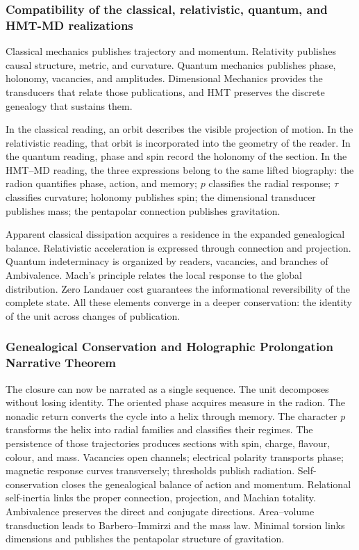 \subsubsection{Compatibility of the classical, relativistic, quantum, and HMT-MD realizations}

Classical mechanics publishes trajectory and momentum. Relativity publishes causal structure, metric, and curvature. Quantum mechanics publishes phase, holonomy, vacancies, and amplitudes. Dimensional Mechanics provides the transducers that relate those publications, and HMT preserves the discrete genealogy that sustains them.

In the classical reading, an orbit describes the visible projection of motion. In the relativistic reading, that orbit is incorporated into the geometry of the reader. In the quantum reading, phase and spin record the holonomy of the section. In the HMT--MD reading, the three expressions belong to the same lifted biography: the radion quantifies phase, action, and memory; \(p\) classifies the radial response; \(\tau\) classifies curvature; holonomy publishes spin; the dimensional transducer publishes mass; the pentapolar connection publishes gravitation.

Apparent classical dissipation acquires a residence in the expanded genealogical balance. Relativistic acceleration is expressed through connection and projection. Quantum indeterminacy is organized by readers, vacancies, and branches of Ambivalence. Mach's principle relates the local response to the global distribution. Zero Landauer cost guarantees the informational reversibility of the complete state. All these elements converge in a deeper conservation: the identity of the unit across changes of publication.

\subsubsection{Genealogical Conservation and Holographic Prolongation Narrative Theorem}

The closure can now be narrated as a single sequence. The unit decomposes without losing identity. The oriented phase acquires measure in the radion. The nonadic return converts the cycle into a helix through memory. The character \(p\) transforms the helix into radial families and classifies their regimes. The persistence of those trajectories produces sections with spin, charge, flavour, colour, and mass. Vacancies open channels; electrical polarity transports phase; magnetic response curves transversely; thresholds publish radiation. Self-conservation closes the genealogical balance of action and momentum. Relational self-inertia links the proper connection, projection, and Machian totality. Ambivalence preserves the direct and conjugate directions. Area--volume transduction leads to Barbero--Immirzi and the mass law. Minimal torsion links dimensions and publishes the pentapolar structure of gravitation.

